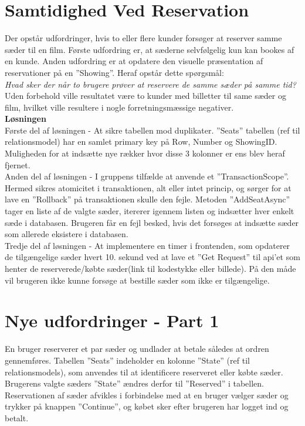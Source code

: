 \section{Samtidighed Ved Reservation}\label{sec:svr}
Der opstår udfordringer, hvis to eller flere kunder forsøger at reserver samme 
sæder til en film. Første udfordring er, at sæderne selvfølgelig kun kan bookes 
af en kunde. Anden udfordring er at opdatere den visuelle præsentation af 
reservationer på en ”Showing”. Heraf opstår dette spørgsmål:\\

\textit{Hvad sker der når to brugere prøver at reservere de 
samme sæder på samme tid?}\\

Uden forbehold ville resultatet være to kunder med billetter til same sæder og 
film, hvilket ville resultere i nogle forretningsmæssige negativer.\\

\textbf{Løsningen}\\
Første del af løsningen - At sikre tabellen mod duplikater. ”Seats” tabellen 
(ref til relationsmodel) har en samlet primary key på Row, Number og ShowingID. 
Muligheden for at indsætte nye rækker hvor disse 3 kolonner er ens blev heraf 
fjernet.\\

Anden del af løsningen - I gruppens tilfælde at anvende et ”TransactionScope”. 
Hermed sikres atomicitet i transaktionen, alt eller intet princip, og sørger for 
at lave en ”Rollback” på transaktionen skulle den fejle.
Metoden ”AddSeatAsync” tager en liste af de valgte sæder, itererer igennem 
listen og indsætter hver enkelt sæde i databasen. Brugeren får en fejl besked, 
hvis det forsøges at indsætte sæder som allerede eksistere i databasen.\\

Tredje del af løsningen - At implementere en timer i frontenden, som opdaterer 
de tilgængelige sæder hvert 10. sekund ved at lave et ”Get Request” til api’et 
som henter de reserverede/købte sæder(link til kodestykke eller billede). 
På den måde vil brugeren ikke kunne forsøge at bestille sæder som ikke er 
tilgængelige.\\

\section{Nye udfordringer - Part 1}\label{sec:part1}
En bruger reserverer et par sæder og undlader at betale således at ordren 
gennemføres. Tabellen ”Seats” indeholder en kolonne ”State” 
(ref til relationsmodels), som anvendes til at identificere reserveret eller 
købte sæder. Brugerens valgte sæders ”State” ændres derfor til ”Reserved” i 
tabellen. Reservationen af sæder afvikles i forbindelse med at en bruger vælger 
sæder og trykker på knappen ”Continue”, og købet sker efter brugeren har logget 
ind og betalt.\\

